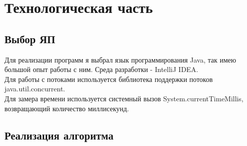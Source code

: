 \documentclass[12pt]{report}
\begin{document}
\chapter{Технологическая часть}
\section{Выбор ЯП}
Для реализации программ я выбрал язык программирования Java, так имею большой опыт работы с ним. Среда разработки - IntelliJ IDEA. \\

Для работы с потоками используется библиотека поддержки потоков java.util.concurrent. \\
Для замера времени используется системный вызов System.currentTimeMillis, возвращающий количество миллисекунд.\\


\section{Реализация алгоритма}
\end{document}
